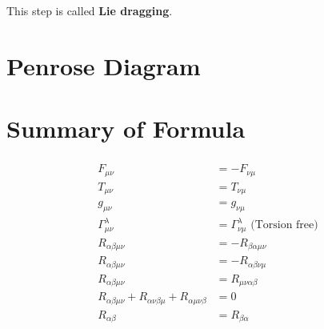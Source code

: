 \documentclass[12pt]{article}
\theoremstyle{mystyle}{\newtheorem{definition}{Definition}[section]}
\theoremstyle{mystyle}{\newtheorem{theorem}[definition]{Theorem}}
\theoremstyle{mystyle}{\newtheorem*{remark}{Remark}}
\theoremstyle{mystyle}{\newtheorem*{example}{Example}}
\theoremstyle{mystyle}{\newtheorem*{examples}{Examples}}
\theoremstyle{cstyle}{\newtheorem*{cthm}{}}
\begin{document}
This step is called \textbf{Lie dragging}.


\section{Penrose Diagram}
\section{Summary of Formula}
\begin{align*}
  \begin{split}
    F_{\mu\nu} &= - F_{\nu\mu}\\
    T_{\mu\nu} &= T_{\nu\mu}\\
    g_{\mu\nu} &= g_{\nu\mu}\\
    \Gamma ^{\lambda}_{\mu\nu} &= \Gamma^{\lambda}_{\nu\mu} \text{ (Torsion free)}\\
    R_{\alpha\beta\mu\nu} &= -R_{\beta\alpha\mu\nu}\\
    R_{\alpha\beta\mu\nu} &= -R_{\alpha\beta\nu\mu}\\
    R_{\alpha\beta\mu\nu} &= R_{\mu\nu\alpha\beta}\\
    R_{\alpha\beta\mu\nu} + R_{\alpha\nu\beta\mu} + R_{\alpha\mu\nu\beta} &= 0 \\
    R_{\alpha\beta} &= R_{\beta\alpha}
  \end{split}
\end{align*}
\end{document}
